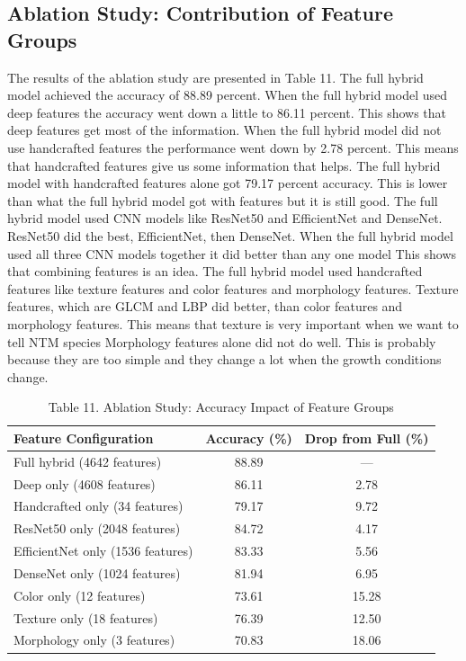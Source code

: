 \documentclass[journal,article,submit,pdftex,moreauthors]{Definitions/mdpi}
\begin{document}
\subsection{\textbf{Ablation Study: Contribution of Feature Groups}}
The results of the ablation study are presented in Table 11. The full hybrid model achieved the accuracy of 88.89 percent. When the full hybrid model used deep features the accuracy went down a little to 86.11 percent. This shows that deep features get most of the information. When the full hybrid model did not use handcrafted features the performance went down by 2.78 percent. This means that handcrafted features give us some information that helps. The full hybrid model with handcrafted features alone got 79.17 percent accuracy. This is lower than what the full hybrid model got with features but it is still good.
The full hybrid model used CNN models like ResNet50 and EfficientNet and DenseNet. ResNet50 did the best, EfficientNet, then DenseNet. When the full hybrid model used all three CNN models together it did better than any one model This shows that combining features is an idea. The full hybrid model used handcrafted features like texture features and color features and morphology features. Texture features, which are GLCM and LBP did better, than color features and morphology features. This means that texture is very important when we want to tell NTM species Morphology features alone did not do well. This is probably because they are too simple and they change a lot when the growth conditions change.
\begin{table}[h]
	\centering
	\caption{Table 11. Ablation Study: Accuracy Impact of Feature Groups}
	\begin{tabular}{|l|c|c|}
		\hline
		\textbf{Feature Configuration} & \textbf{Accuracy (\%)} & \textbf{Drop from Full (\%)} \\
		\hline
		Full hybrid (4642 features) & 88.89 & --- \\
		\hline
		Deep only (4608 features) & 86.11 & 2.78 \\
		\hline
		Handcrafted only (34 features) & 79.17 & 9.72 \\
		\hline
		ResNet50 only (2048 features) & 84.72 & 4.17 \\
		\hline
		EfficientNet only (1536 features) & 83.33 & 5.56 \\
		\hline
		DenseNet only (1024 features) & 81.94 & 6.95 \\
		\hline
		Color only (12 features) & 73.61 & 15.28 \\
		\hline
		Texture only (18 features) & 76.39 & 12.50 \\
		\hline
		Morphology only (3 features) & 70.83 & 18.06 \\
		\hline
	\end{tabular}
	\label{tab:ablation_study}
\end{table}
\end{document}
